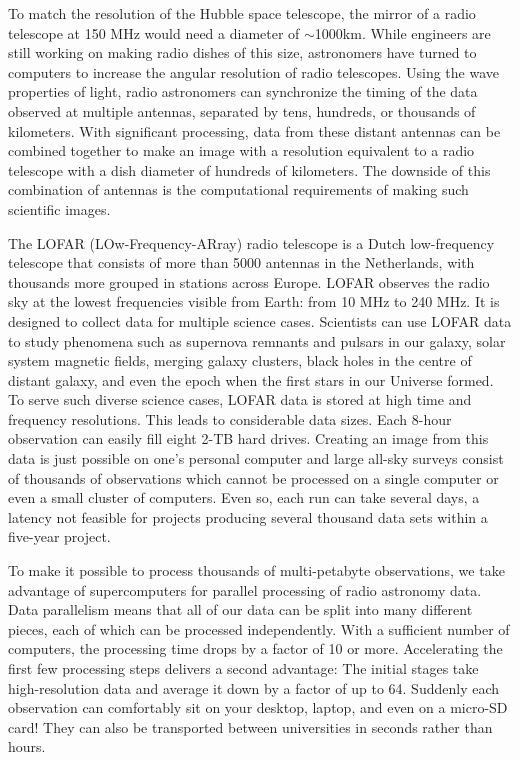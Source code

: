 To match the resolution of the Hubble space telescope, the mirror of a radio telescope at 150 MHz would need a diameter of $\sim$1000km. While engineers are still working on making radio dishes of this size, astronomers have turned to computers to increase the angular resolution of radio telescopes. Using the wave properties of light, radio astronomers can synchronize the timing of the data observed at multiple antennas, separated by tens, hundreds, or thousands of kilometers. With significant processing, data from these distant antennas can be combined together to make an image with a resolution equivalent to a radio telescope with a dish diameter of hundreds of kilometers. The downside of this combination of antennas is the computational requirements of making such scientific images.

The LOFAR (LOw-Frequency-ARray) radio telescope is a Dutch low-frequency telescope that consists of more than 5000 antennas in the Netherlands, with thousands more grouped in stations across Europe. LOFAR observes the radio sky at the lowest frequencies visible from Earth: from 10 MHz to 240 MHz. It is designed to collect data for multiple science cases. Scientists can use LOFAR data to study phenomena such as supernova remnants and pulsars in our galaxy, solar system magnetic fields, merging galaxy clusters, black holes in the centre of distant galaxy, and even the epoch when the first stars in our Universe formed. To serve such diverse science cases, LOFAR data is stored at high time and frequency resolutions. This leads to considerable data sizes. Each 8-hour observation can easily fill eight 2-TB hard drives. Creating an image from this data is just possible on one's personal computer and large all-sky surveys consist of thousands of observations which cannot be processed on a single computer or even a small cluster of computers. Even so, each run can take several days, a latency not feasible for projects producing several thousand data sets within a five-year project.

To make it possible to process thousands of multi-petabyte observations, we take advantage of supercomputers for parallel processing of radio astronomy data. Data parallelism means that all of our data can be split into many different pieces, each of which can be processed independently. With a sufficient number of computers, the processing time drops by a factor of 10 or more. Accelerating the first few processing steps delivers a second advantage: The initial stages take high-resolution data and average it down by a factor of up to 64. Suddenly each observation can comfortably sit on your desktop, laptop, and even on a micro-SD card! They can also be transported between universities in seconds rather than hours. 

